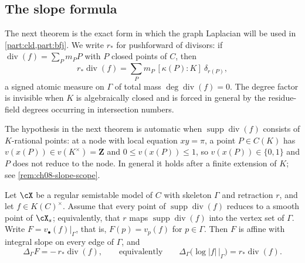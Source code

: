 \subsection{The slope formula}

The next theorem is the exact form in which the graph Laplacian will be used
in \cref{part:cld,part:bfj}.  We write $r_*$ for pushforward of divisors:
if $\operatorname{div}(f)=\sum_Pm_PP$ with $P$ closed points of $C$, then
\[
 r_*\operatorname{div}(f)
   =\sum_Pm_P\,[\kappa(P):K]\ \delta_{r(P)} ,
\]
a signed atomic measure on $\Gamma$ of total mass
$\deg\operatorname{div}(f)=0$.  The degree factor is invisible when $K$ is
algebraically closed and is forced in general by the residue-field degrees
occurring in intersection numbers.

The hypothesis in the next theorem is automatic when
$\operatorname{supp}\operatorname{div}(f)$ consists of $K$-rational
points: at a node with local equation $xy=\pi$, a point $P\in C(K)$ has
$v(x(P))\in v(K^\times)=\mathbf Z$ and $0\leq v(x(P))\leq1$, so
$v(x(P))\in\{0,1\}$ and $P$ does not reduce to the node.  In general it
holds after a finite extension of $K$; see
\cref{rem:ch08-slope-scope}.

\begin{theorem}
\label{thm:ch08-slope-formula}
Let $\cX$ be a regular semistable model of $C$ with skeleton $\Gamma$ and
retraction $r$, and let $f\in K(C)^\times$.  Assume that every point of
$\operatorname{supp}\operatorname{div}(f)$ reduces to a smooth point of
$\cX_s$; equivalently, that $r$ maps
$\operatorname{supp}\operatorname{div}(f)$ into the vertex set of $\Gamma$.
Write $F=v_\bullet(f)|_\Gamma$, that is, $F(p)=v_p(f)$ for $p\in\Gamma$.
Then $F$ is affine with integral slope on every edge of $\Gamma$, and
\begin{equation}
\label{eq:ch08-slope-formula}
 \Delta_\Gamma F=-\,r_*\operatorname{div}(f) ,
 \qquad\text{equivalently}\qquad
 \Delta_\Gamma\bigl(\log|f|\,\bigr|_\Gamma\bigr)=r_*\operatorname{div}(f) .
\end{equation}
\end{theorem}

